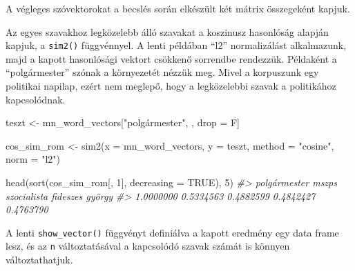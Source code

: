 \documentclass[
]{book}
\newenvironment{Shaded}{\begin{snugshade}}{\end{snugshade}}
\newcommand{\AttributeTok}[1]{\textcolor[rgb]{0.77,0.63,0.00}{#1}}
\newcommand{\CommentTok}[1]{\textcolor[rgb]{0.56,0.35,0.01}{\textit{#1}}}
\newcommand{\ConstantTok}[1]{\textcolor[rgb]{0.00,0.00,0.00}{#1}}
\newcommand{\DecValTok}[1]{\textcolor[rgb]{0.00,0.00,0.81}{#1}}
\newcommand{\FunctionTok}[1]{\textcolor[rgb]{0.00,0.00,0.00}{#1}}
\newcommand{\NormalTok}[1]{#1}
\newcommand{\OtherTok}[1]{\textcolor[rgb]{0.56,0.35,0.01}{#1}}
\newcommand{\SpecialCharTok}[1]{\textcolor[rgb]{0.00,0.00,0.00}{#1}}
\newcommand{\StringTok}[1]{\textcolor[rgb]{0.31,0.60,0.02}{#1}}
\begin{document}
A végleges szóvektorokat a becslés során elkészült két mátrix
összegeként kapjuk.

\begin{Shaded}
\end{Shaded}

Az egyes szavakhoz legközelebb álló szavakat a koszinusz hasonlóság
alapján kapjuk, a \texttt{sim2()} függvénnyel. A lenti példában ``l2''
normalizálást alkalmazunk, majd a kapott hasonlósági vektort csökkenő
sorrendbe rendezzük. Példaként a ``polgármester'' szónak a környezetét
nézzük meg. Mivel a korpuszunk egy politikai napilap, ezért nem meglepő,
hogy a legközelebbi szavak a politikához kapcsolódnak.

\begin{Shaded}
\begin{Highlighting}[]
\NormalTok{teszt }\OtherTok{\textless{}{-}}\NormalTok{ mn\_word\_vectors[}\StringTok{"polgármester"}\NormalTok{, , drop }\OtherTok{=}\NormalTok{ F]}

\NormalTok{cos\_sim\_rom }\OtherTok{\textless{}{-}} \FunctionTok{sim2}\NormalTok{(}\AttributeTok{x =}\NormalTok{ mn\_word\_vectors, }\AttributeTok{y =}\NormalTok{ teszt, }\AttributeTok{method =} \StringTok{"cosine"}\NormalTok{, }\AttributeTok{norm =} \StringTok{"l2"}\NormalTok{)}

\FunctionTok{head}\NormalTok{(}\FunctionTok{sort}\NormalTok{(cos\_sim\_rom[, }\DecValTok{1}\NormalTok{], }\AttributeTok{decreasing =} \ConstantTok{TRUE}\NormalTok{), }\DecValTok{5}\NormalTok{)}
\CommentTok{\#\textgreater{} polgármester        mszps  szocialista     fideszes       györgy }
\CommentTok{\#\textgreater{}    1.0000000    0.5334563    0.4882599    0.4842427    0.4763790}
\end{Highlighting}
\end{Shaded}

A lenti \texttt{show\_vector()} függvényt definiálva a kapott eredmény
egy data frame lesz, és az \texttt{n} változtatásával a kapcsolódó
szavak számát is könnyen változtathatjuk.
\end{document}
